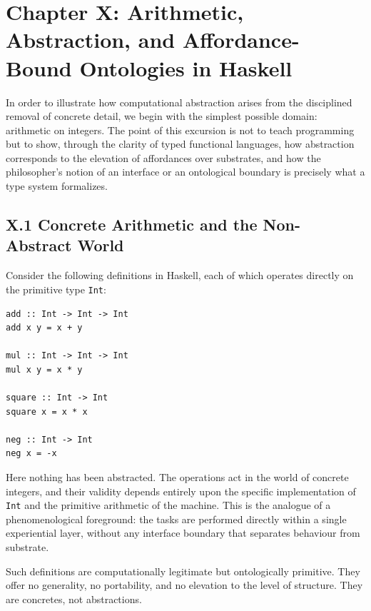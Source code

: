 \documentclass[12pt,letterpaper]{article}
\begin{document}
\section{Chapter X: Arithmetic, Abstraction, and Affordance-Bound Ontologies in Haskell}

In order to illustrate how computational abstraction arises from the disciplined removal of concrete detail, we begin with the simplest possible domain: arithmetic on integers. The point of this excursion is not to teach programming but to show, through the clarity of typed functional languages, how abstraction corresponds to the elevation of affordances over substrates, and how the philosopher’s notion of an interface or an ontological boundary is precisely what a type system formalizes.

\subsection{X.1 Concrete Arithmetic and the Non-Abstract World}

Consider the following definitions in Haskell, each of which operates directly on the primitive type \texttt{Int}:

\begin{verbatim}
add :: Int -> Int -> Int
add x y = x + y

mul :: Int -> Int -> Int
mul x y = x * y

square :: Int -> Int
square x = x * x

neg :: Int -> Int
neg x = -x
\end{verbatim}

Here nothing has been abstracted. The operations act in the world of concrete integers, and their validity depends entirely upon the specific implementation of \texttt{Int} and the primitive arithmetic of the machine. This is the analogue of a phenomenological foreground: the tasks are performed directly within a single experiential layer, without any interface boundary that separates behaviour from substrate.

Such definitions are computationally legitimate but ontologically primitive. They offer no generality, no portability, and no elevation to the level of structure. They are concretes, not abstractions.
\end{document}
